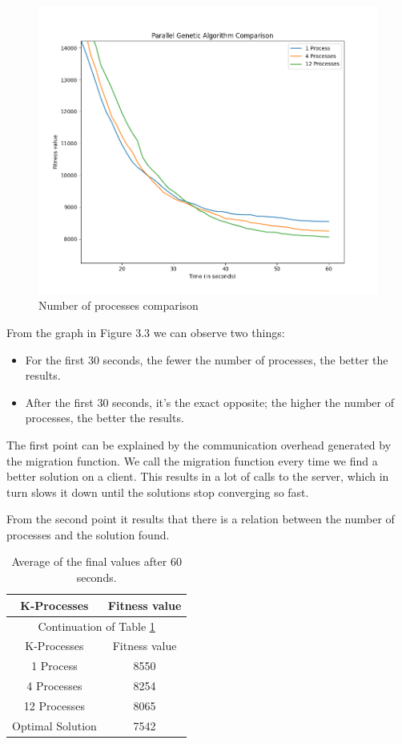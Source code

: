 \begin{figure}[ht]
\includegraphics[width=\textwidth]{images/results.png}
\caption{Number of processes comparison}
\end{figure}
\newpage
\noindent
From the graph in Figure 3.3 we can observe two things:
\begin{itemize}
    \item For the first 30 seconds, the fewer the number of processes, the better the results.
    \item After the first 30 seconds, it's the exact opposite; the higher the number of processes, the better the results.
\end{itemize}
\par
The first point can be explained by the communication overhead generated by the migration function. We call the migration function every time we find a better solution on a client. This results in a lot of calls to the server, which in turn slows it down until the solutions stop converging so fast.
\par
From the second point it results that there is a relation between the number of processes and the solution found.
\newline
 \begin{longtable}[c]{| c | c |}
 \caption{Average of the final values after 60 seconds.\label{long}}\\
 \hline
 K-Processes & Fitness value\\
 \hline
 \endfirsthead

 \hline
 \multicolumn{2}{|c|}{Continuation of Table \ref{long}}\\
 \hline
 K-Processes & Fitness value\\
 \hline
 \endhead

 \hline
 \endfoot

 1 Process & 8550\\
4 Processes & 8254\\
 12 Processes & 8065\\
 \hline
 Optimal Solution & 7542\\
 \end{longtable}
